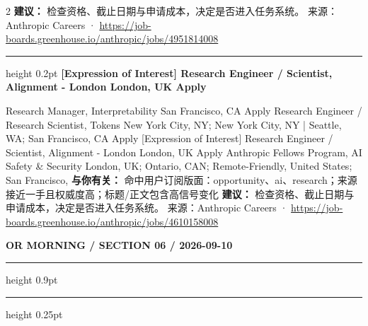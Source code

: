 \documentclass[10.5pt]{ctexart}
\begin{document}
\begin{multicols}{2}
\textbf{建议：} 检查资格、截止日期与申请成本，决定是否进入任务系统。
{\footnotesize\color{ormuted} 来源：Anthropic Careers · \url{https://job-boards.greenhouse.io/anthropic/jobs/4951814008}}
\vspace{2mm}
\hrule height 0.2pt
\vspace{2mm}
{\large\bfseries [Expression of Interest] Research Engineer / Scientist, Alignment - London London, UK Apply}\par
[Expression of Interest] Research Manager, Interpretability San Francisco, CA Apply Research Engineer / Research Scientist, Tokens New York City, NY; New York City, NY | Seattle, WA; San Francisco, CA Apply [Expression of Interest] Research Engineer / Scientist, Alignment - London London, UK Apply Anthropic Fellows Program, AI Safety \& Security London, UK; Ontario, CAN; Remote-Friendly, United States; San Francisco, 
\textbf{与你有关：} 命中用户订阅版面：opportunity、ai、research；来源接近一手且权威度高；标题/正文包含高信号变化
\textbf{建议：} 检查资格、截止日期与申请成本，决定是否进入任务系统。
{\footnotesize\color{ormuted} 来源：Anthropic Careers · \url{https://job-boards.greenhouse.io/anthropic/jobs/4610158008}}
\end{multicols}
\newpage
{\small\bfseries OR MORNING / SECTION 06 / 2026-09-10}
\vspace{2mm}
\hrule height 0.9pt
\vspace{1.5mm}
\hrule height 0.25pt
\vspace{4mm}
\end{document}
